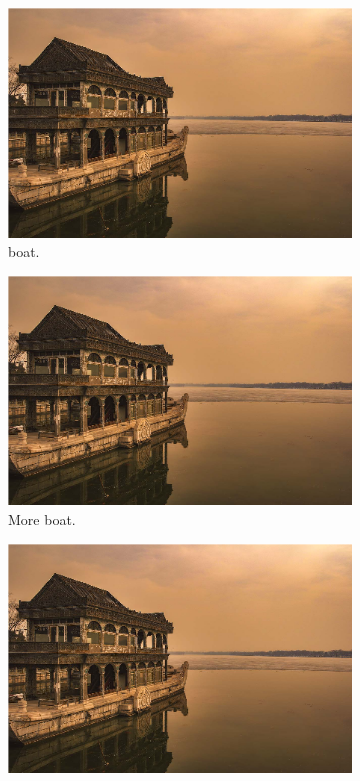 \documentclass[a4paper,11pt,onecolumn]{article}
\begin{document}
\begin{enumerate}
  \begin{figure}[hbtp]
    \centering
    \begin{subfigure}[b]{0.2\linewidth}
      \includegraphics[width=\linewidth]{materials/boat.png}
      \caption{boat.}
    \end{subfigure}
    \begin{subfigure}[b]{0.2\linewidth}
      \includegraphics[width=\linewidth]{materials/boat.png}
      \caption{More boat.}
    \end{subfigure}
    \begin{subfigure}[b]{0.2\linewidth}
      \includegraphics[width=\linewidth]{materials/boat.png}

\end{subfigure}
\end{figure}
\end{enumerate}
\end{document}
